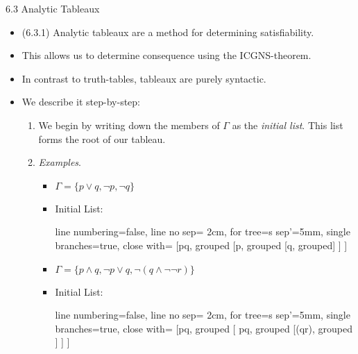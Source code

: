 \begin{frame}{6.3 Analytic Tableaux}

	\begin{itemize}
		
		\item (6.3.1) Analytic tableaux are a method for determining satisfiability. 
		
		\item This allows us to determine consequence using the ICGNS-theorem. 
		
		\item In contrast to truth-tables, tableaux are purely syntactic.
		
		\item We describe it step-by-step:
		
		\begin{enumerate}[1.]
		
			\item We begin by writing down the members of $\Gamma$ as the \emph{initial list}. This list forms the root of our tableau.
			
			\item[] \emph{Examples}.
			
			\begin{itemize}

				\item $\Gamma=\{p\lor q, \neg p, \neg q\}$

				\item[] Initial List: 

					\begin{prooftree}
						{
						line numbering=false,
						line no sep= 2cm,
						for tree={s sep'=5mm},
						single branches=true,
						close with=\xmark
						}
						[p\lor q, grouped [\neg p, grouped [\neg q, grouped] ] ]
					\end{prooftree}
					
				\item $\Gamma=\{p\land q, \neg p\lor q, \neg (q\land \neg \neg r)\}$

					\item[] Initial List:

					\begin{prooftree}
					{
					line numbering=false,
					line no sep= 2cm,
					for tree={s sep'=5mm},
					single branches=true,
					close with=\xmark
					}
					[p\land q, grouped [ \neg p\lor q, grouped [\neg (q\land \neg \neg r), grouped ] ] ]
					\end{prooftree}
					

			\end{itemize}
		
		\end{enumerate}
	
	\end{itemize}

\end{frame}

